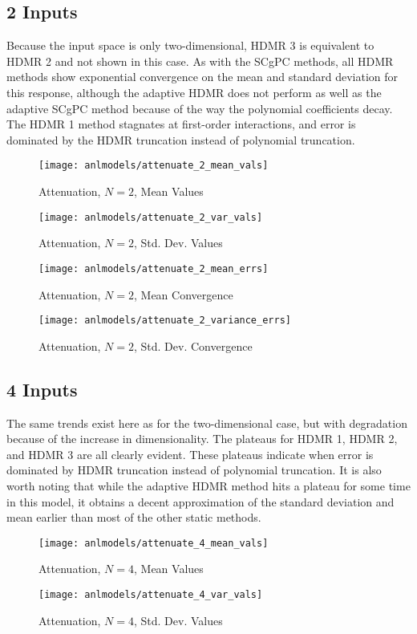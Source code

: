 \subsection{2 Inputs}
Because the input space is only two-dimensional, HDMR 3 is equivalent to HDMR 2 and not shown in this case.
As with the SCgPC methods, all HDMR methods show exponential convergence on the mean and standard deviation
for this response, although the adaptive HDMR does not perform as well as the adaptive SCgPC method because of
the way the polynomial coefficients decay.  The HDMR 1 method stagnates at first-order interactions, and
error is dominated by the HDMR truncation instead of polynomial truncation.
\begin{figure}[H]
  \centering
  \texttt{[image: anlmodels/attenuate\_2\_mean\_vals]}
  \caption{Attenuation, $N=2$, Mean Values}
  \label{fig:attenuate mean values 2}
\end{figure}
\begin{figure}[H]
  \centering
  \texttt{[image: anlmodels/attenuate\_2\_var\_vals]}
  \caption{Attenuation, $N=2$, Std. Dev. Values}
  \label{fig:attenuate var values 2}
\end{figure}

\begin{figure}[H]
  \centering
  \texttt{[image: anlmodels/attenuate\_2\_mean\_errs]}
  \caption{Attenuation, $N=2$, Mean Convergence}
  \label{fig:attenuate mean errors 2}
\end{figure}
\begin{figure}[H]
  \centering
  \texttt{[image: anlmodels/attenuate\_2\_variance\_errs]}
  \caption{Attenuation, $N=2$, Std. Dev. Convergence}
  \label{fig:attenuate var errors 2}
\end{figure}


\subsection{4 Inputs}
The same trends exist here as for the two-dimensional case, but with degradation because of the increase in
dimensionality.  The plateaus for HDMR 1, HDMR 2, and HDMR 3 are all clearly evident.  These plateaus indicate
when error is dominated by HDMR truncation instead of polynomial truncation.  It is also worth noting that
while the adaptive HDMR method hits a plateau for some time in this model, it obtains a decent approximation
of the standard deviation and mean earlier than most of the other static methods.
\begin{figure}[H]
  \centering
  \texttt{[image: anlmodels/attenuate\_4\_mean\_vals]}
  \caption{Attenuation, $N=4$, Mean Values}
  \label{fig:attenuate mean values 4}
\end{figure}
\begin{figure}[H]
  \centering
  \texttt{[image: anlmodels/attenuate\_4\_var\_vals]}
  \caption{Attenuation, $N=4$, Std. Dev. Values}
  \label{fig:attenuate var values 4}
\end{figure}

